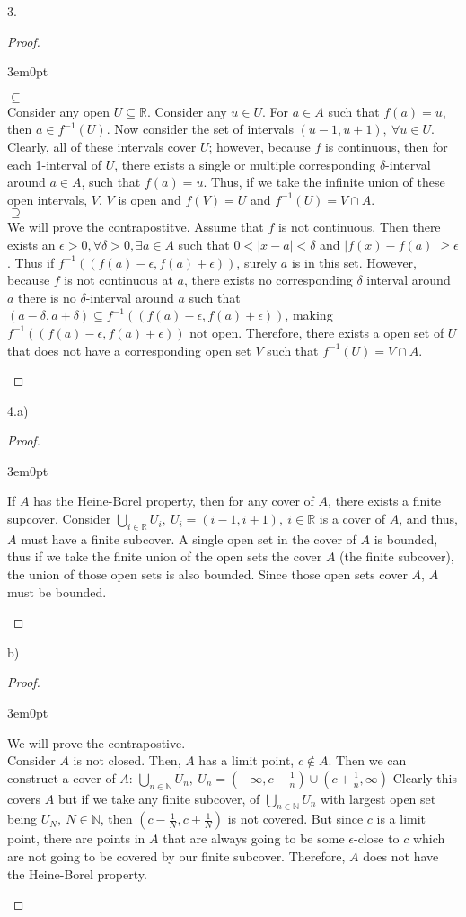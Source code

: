 \documentclass[11pt]{article}
\newcommand{\R}{\mathbb{R}}
\newcommand{\N}{\mathbb{N}}
\newenvironment{myproof}
{\begin{proof} \begin{adjustwidth}{3em}{0pt}$ $\par\nobreak\ignorespaces}
{\end{adjustwidth} \end{proof}}
\begin{document}
\begin{flushleft}
3.

\begin{myproof}

$\subseteq$ \\
Consider any open $U \subseteq \R$. Consider any $u \in U$. For $a \in A$ such that $f(a) = u$, then $a \in f^{-1}(U)$. Now consider the set of intervals $(u - 1, u + 1), \ \forall u \in U$. Clearly, all of these intervals cover $U$; however, because $f$ is continuous, then for each 1-interval of $U$, there exists a single or multiple corresponding $\delta$-interval around $a \in A$, such that $f(a) = u$. Thus, if we take the infinite union of these open intervals, $V$, $V$ is open and $f(V) = U$ and $f^{-1}(U) = V \cap A$.\\
\bigskip
$\supseteq$ \\
We will prove the contrapostitve. Assume that $f$ is not continuous. Then there exists an $\epsilon > 0, \forall \delta > 0, \exists a \in A$ such that $0<|x-a|<\delta$ and $|f(x)-f(a)| \geq \epsilon$. Thus if $f^{-1}((f(a)-\epsilon, f(a) + \epsilon))$, surely $a$ is in this set. However, because $f$ is not continuous at $a$, there exists no corresponding $\delta$ interval around $a$ there is no $\delta$-interval around $a$ such that $(a-\delta, a + \delta) \subseteq f^{-1}((f(a)-\epsilon, f(a) + \epsilon))$, making $f^{-1}((f(a)-\epsilon, f(a) + \epsilon))$ not open. Therefore, there exists a open set of $U$ that does not have a corresponding open set $V$ such that $f^{-1}(U) = V \cap A$.

\end{myproof}

\newpage

4.a)

\begin{myproof}

If $A$ has the Heine-Borel property, then for any cover of $A$, there exists a finite supcover. Consider $\bigcup_{i\in \R} U_i, \ U_i = (i-1,i+1), \ i \in \R$ is a cover of $A$, and thus, $A$ must have a finite subcover. A single open set in the cover of $A$ is bounded, thus if we take the finite union of the open sets the cover $A$ (the finite subcover), the union of those open sets is also bounded. Since those open sets cover $A$, $A$ must be bounded.

\end{myproof}

b)

\begin{myproof}

We will prove the contrapostive.\\
\bigskip
Consider $A$ is not closed. Then, $A$ has a limit point, $c \notin A$. Then we can construct a cover of $A$: $\bigcup_{n \in \N}U_n, \ U_n = (- \infty, c-\frac{1}{n}) \cup (c + \frac{1}{n}, \infty)$ Clearly this covers $A$ but if we take any finite subcover, of $\bigcup_{n \in \N}U_n$ with largest open set being $U_N, \ N \in \N$, then $(c-\frac{1}{N},c+\frac{1}{N})$ is not covered. But since $c$ is a limit point, there are points in $A$ that are always going to be some $\epsilon$-close to $c$ which are not going to be covered by our finite subcover. Therefore, $A$ does not have the Heine-Borel property.


\end{myproof}
\end{flushleft}
\end{document}
